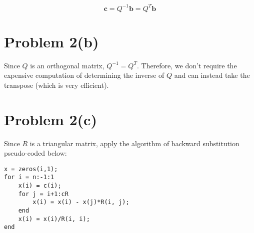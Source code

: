 \documentclass{article}
\newcommand{\itab}[1]{\hspace{0em}\rlap{#1}}
\newcommand{\tab}[1]{\hspace{.05\textwidth}\rlap{#1}}
\newif\ifstays
\newenvironment{pgm}{
  \begin{center}\begin{tabbing}
  xx \= xx \= xx \= xx \= xx \= xx \= xx \= xx \= xx \= xx \= xx \= \kill\>\+}{
  \end{tabbing}\end{center}}
\begin{document}
$$ \mathbf{c} = Q^{-1}\mathbf{b} = Q^{T}\mathbf{b}$$

\section*{Problem 2(b)}

Since $Q$ is an orthogonal matrix, $Q^{-1} = Q^{T}$. Therefore, we don't require the expensive computation of determining the inverse of $Q$ and can instead take the transpose (which is very efficient).

\section*{Problem 2(c)}

Since $R$ is a triangular matrix, apply the algorithm of backward substitution pseudo-coded below:






\begin{verbatim}
x = zeros(i,1);
for i = n:-1:1
    x(i) = c(i);
    for j = i+1:cR
        x(i) = x(i) - x(j)*R(i, j);
    end
    x(i) = x(i)/R(i, i);
end
\end{verbatim}

\ifstays
Here is one way to render the Gram-Schmidt pseudo-code in \LaTeX. You can use this as a template to write your own pseudo-code.
\newcommand{\ba}{\mathbf{a}}
\newcommand{\bq}{\mathbf{q}}
\begin{pgm}
\mbox{}\+\+\+\+\\
$r = 0$\\
for $j=1$ to $n$\+\\
$\ba'_{j} = \ba_{j} - \sum_{i=1}^{r} (\bq_{i}^{T}\ba_{j})\bq_{i}$\\
if $\|\ba'_{j}\| \neq \mathbf{0}$\+\\
  $r = r+1$\\
  $\bq_{r} = \frac{\ba'_{j}}{\|\ba'_{j}\|}$\-\\
end\-\\
end
\end{pgm}
The \verb#\+# and \verb#\-# commands tell the interpreter respectively to add or remove one indentation tab from subsequent lines. The \texttt{pgm} environment is defined for you in the preamble of the \verb#template.tex# file.
\fi
\end{document}

